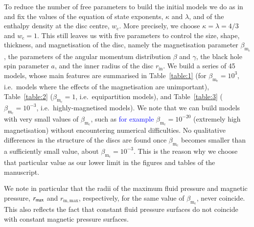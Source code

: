 \documentclass{aa}
\newcommand{\sg}[1]{\textcolor{blue}{#1}}
\begin{document}
To reduce the number of free parameters to build the initial models we do as in~\citet{Komissarov:2006} and fix the values of the equation of state exponents, $\kappa$ and $\lambda$, and of the enthalpy density at the disc centre, $w_{\mathrm{c}}$. More precisely, we choose $\kappa = \lambda = 4/3$ and $w_{\mathrm{c}} = 1$. This still leaves us with five parameters to control the size, shape, thickness, and magnetisation of the disc, namely the magnetisation parameter $\beta_{\mathrm{m}_{\mathrm{c}}}$, the parameters of the angular momentum distribution $\beta$ and $\gamma$, the black hole spin parameter $a$, and the inner radius of the disc $r_{\mathrm{in}}$. We build a series of 45 models, whose main features are summarised in Table~\ref{table:1} (for $\beta_{\mathrm{m}_{\mathrm{c}}} = 10^{3}$, i.e.~models where the effects of the magnetisation are unimportant), Table~\ref{table:2} ($\beta_{\mathrm{m}_{\mathrm{c}}} = 1$, i.e.~equipartition models), and Table~\ref{table:3} ($\beta_{\mathrm{m}_{\mathrm{c}}} = 10^{-3}$, i.e.~highly-magnetised models). We note that we can build models with very small values of $\beta_{\mathrm{m}_{\mathrm{c}}}$, such as \sg{for example} $\beta_{\mathrm{m}_{\mathrm{c}}} = 10^{-20}$ (extremely high magnetisation) without encountering numerical difficulties. No qualitative differences in the structure of the discs are found once $\beta_{\mathrm{m}_{\mathrm{c}}}$ becomes smaller than a sufficiently small value, about $\beta_{\mathrm{m}_{\mathrm{c}}}=10^{-3}$. This is the reason why we choose that particular value as our lower limit in the figures and tables of the manuscript.

We note in particular that the radii of the maximum fluid pressure and magnetic pressure, $r_{{\rm{max}}}$ and $r_{{\mathrm{m, max}}}$, respectively, for the same value of $\beta_{\mathrm{m}_{\mathrm{c}}}$, never coincide. This also reflects the fact that constant fluid pressure surfaces do not coincide with constant magnetic pressure surfaces.
\end{document}
